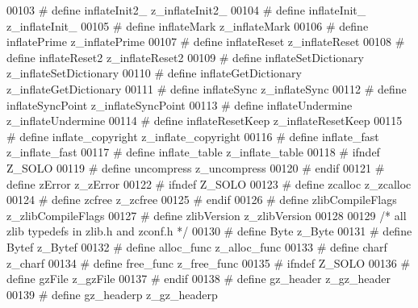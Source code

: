 \begin{DoxyCode}
00103 \textcolor{preprocessor}{#  define inflateInit2\_         z\_inflateInit2\_}
00104 \textcolor{preprocessor}{#  define inflateInit\_          z\_inflateInit\_}
00105 \textcolor{preprocessor}{#  define inflateMark           z\_inflateMark}
00106 \textcolor{preprocessor}{#  define inflatePrime          z\_inflatePrime}
00107 \textcolor{preprocessor}{#  define inflateReset          z\_inflateReset}
00108 \textcolor{preprocessor}{#  define inflateReset2         z\_inflateReset2}
00109 \textcolor{preprocessor}{#  define inflateSetDictionary  z\_inflateSetDictionary}
00110 \textcolor{preprocessor}{#  define inflateGetDictionary  z\_inflateGetDictionary}
00111 \textcolor{preprocessor}{#  define inflateSync           z\_inflateSync}
00112 \textcolor{preprocessor}{#  define inflateSyncPoint      z\_inflateSyncPoint}
00113 \textcolor{preprocessor}{#  define inflateUndermine      z\_inflateUndermine}
00114 \textcolor{preprocessor}{#  define inflateResetKeep      z\_inflateResetKeep}
00115 \textcolor{preprocessor}{#  define inflate\_copyright     z\_inflate\_copyright}
00116 \textcolor{preprocessor}{#  define inflate\_fast          z\_inflate\_fast}
00117 \textcolor{preprocessor}{#  define inflate\_table         z\_inflate\_table}
00118 \textcolor{preprocessor}{#  ifndef Z\_SOLO}
00119 \textcolor{preprocessor}{#    define uncompress            z\_uncompress}
00120 \textcolor{preprocessor}{#  endif}
00121 \textcolor{preprocessor}{#  define zError                z\_zError}
00122 \textcolor{preprocessor}{#  ifndef Z\_SOLO}
00123 \textcolor{preprocessor}{#    define zcalloc               z\_zcalloc}
00124 \textcolor{preprocessor}{#    define zcfree                z\_zcfree}
00125 \textcolor{preprocessor}{#  endif}
00126 \textcolor{preprocessor}{#  define zlibCompileFlags      z\_zlibCompileFlags}
00127 \textcolor{preprocessor}{#  define zlibVersion           z\_zlibVersion}
00128 
00129 \textcolor{comment}{/* all zlib typedefs in zlib.h and zconf.h */}
00130 \textcolor{preprocessor}{#  define Byte                  z\_Byte}
00131 \textcolor{preprocessor}{#  define Bytef                 z\_Bytef}
00132 \textcolor{preprocessor}{#  define alloc\_func            z\_alloc\_func}
00133 \textcolor{preprocessor}{#  define charf                 z\_charf}
00134 \textcolor{preprocessor}{#  define free\_func             z\_free\_func}
00135 \textcolor{preprocessor}{#  ifndef Z\_SOLO}
00136 \textcolor{preprocessor}{#    define gzFile                z\_gzFile}
00137 \textcolor{preprocessor}{#  endif}
00138 \textcolor{preprocessor}{#  define gz\_header             z\_gz\_header}
00139 \textcolor{preprocessor}{#  define gz\_headerp            z\_gz\_headerp}

\end{DoxyCode}
